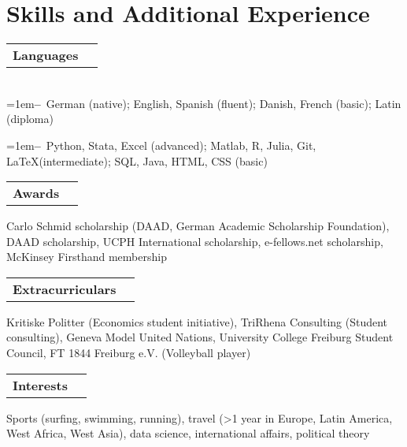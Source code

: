 \documentclass[A4,11pt]{article}
\makeatletter
\newcommand{\Subheading}[4]{   
    \begin{tabular*}{\textwidth}[t]{@{}l @{\extracolsep{\fill}} r@{}}
        \textbf{#1}\textit{\small #2} & \footnotesize #3 \\
    \end{tabular*}
    \small #4 
    \vspace{7pt}
}
\newcommand{\myitem}[1]{\hangindent=1em\hangafter=1\textbf{--}~#1\par}
\makeatother
\begin{document}
\section{Skills and Additional Experience}

    \Subheading
        {Languages}{}{}
        {\\
        \myitem{German (native); English, Spanish (fluent); Danish, French (basic); Latin (diploma)}
        \myitem{Python, Stata, Excel (advanced); Matlab, R, Julia, Git, \LaTeX\space(intermediate); SQL, Java, HTML, CSS (basic)}
        }
    

    \Subheading
        {Awards}{}{}
        {Carlo Schmid scholarship (DAAD, German Academic Scholarship Foundation), 
        DAAD scholarship, 
        UCPH International scholarship, 
        e-fellows.net scholarship, 
        McKinsey Firsthand membership
        } 

    \Subheading
        {Extracurriculars}{}{}
        {Kritiske Politter (Economics student initiative), TriRhena Consulting (Student consulting), 
        Geneva Model United Nations, University College Freiburg Student Council, FT 1844 Freiburg e.V. (Volleyball player)}{}

    \Subheading
        {Interests}{}{}
        {Sports (surfing, swimming, running), travel (>1 year in Europe, Latin America, West Africa, West Asia), data science, international affairs, political theory}

\vfill
{}
\end{document}

